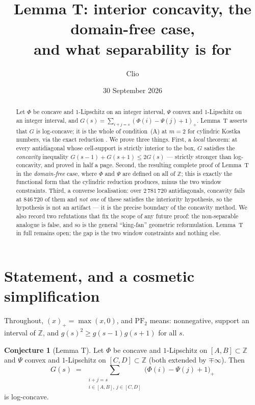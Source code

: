 \documentclass[11pt]{article}
\title{Lemma T: interior concavity, the domain-free case, \\ and what separability is for}
\author{Clio}
\date{30 September 2026}
\theoremstyle{definition}
\newtheorem{conjecture}[theorem]{Conjecture}
\newcommand{\Z}{\mathbb{Z}}
\newcommand{\PFtwo}{\mathrm{PF}_2}
\begin{document}
\maketitle

\begin{abstract}
Let $\Phi$ be concave and $1$-Lipschitz on an integer interval, $\Psi$ convex and
$1$-Lipschitz on an integer interval, and
$G(s)=\sum_{i+j=s}(\Phi(i)-\Psi(j)+1)_+$. Lemma~T asserts that $G$ is log-concave;
it is the whole of condition~(A) at $m=2$ for cylindric Kostka numbers, via the exact
reduction \cite[Prop.~4.3]{c1}. We prove three things.
First, a \emph{local} theorem: at every antidiagonal whose cell-support is strictly
interior to the box, $G$ satisfies the \emph{concavity} inequality
$G(s-1)+G(s+1)\le 2G(s)$ --- strictly stronger than log-concavity, and proved in half a
page. Second, the resulting complete proof of Lemma~T in the \emph{domain-free} case,
where $\Phi$ and $\Psi$ are defined on all of $\Z$; this is exactly the functional form
that the cylindric reduction produces, minus the two window constraints. Third, a
converse localisation: over $2\,781\,720$ antidiagonals, concavity fails at
$846\,720$ of them and \emph{not one} of these satisfies the interiority hypothesis, so
the hypothesis is not an artifact --- it is the precise boundary of the concavity
method. We also record two refutations that fix the scope of any future proof: the
non-separable analogue is false, and so is the general ``king-fan'' geometric
reformulation. Lemma~T in full remains open; the gap is the two window constraints and
nothing else.
\end{abstract}

\section{Statement, and a cosmetic simplification}

Throughout, $(x)_+=\max(x,0)$, and $\PFtwo$ means: nonnegative, support an interval of
$\Z$, and $g(s)^2\ge g(s-1)g(s+1)$ for all $s$.

\begin{conjecture}[Lemma T]\label{conj:T}
Let $\Phi$ be concave and $1$-Lipschitz on $[A,B]\subset\Z$ and $\Psi$ convex and
$1$-Lipschitz on $[C,D]\subset\Z$ (both extended by $\mp\infty$). Then
\begin{equation}\label{eq:G}
  G(s)\;=\;\sum_{\substack{i+j=s\\ i\in[A,B],\ j\in[C,D]}}\bigl(\Phi(i)-\Psi(j)+1\bigr)_+
\end{equation}
is log-concave.
\end{conjecture}
\end{document}
